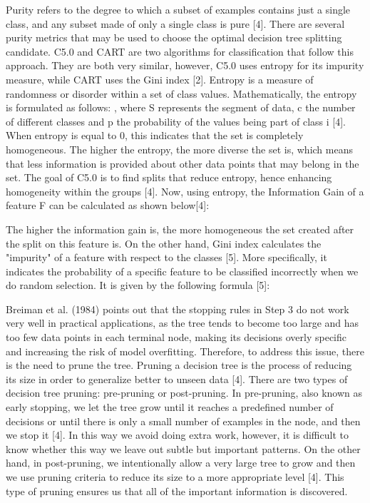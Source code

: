 \documentclass{usiinftr}
\begin{document}
Purity refers to the degree to which a subset of examples contains just a single class, and any subset made of only a single class is pure [4]. There are several purity metrics that may be used to choose the optimal decision tree splitting candidate. C5.0 and CART are two algorithms for classification that follow this approach. They are both very similar, however, C5.0 uses entropy for its impurity measure, while CART uses the Gini index [2]. Entropy is a measure of randomness or disorder within a set of class values. Mathematically, the entropy is formulated as follows: 
,
where S represents the segment of data, c the number of different classes and p the probability of the values being part of class i [4]. When entropy is equal to 0, this indicates that the set is completely homogeneous. The higher the entropy, the more diverse the set is, which means that less information is provided about other data points that may belong in the set. The goal of C5.0 is to find splits that reduce entropy,  hence enhancing homogeneity within the groups [4]. Now, using entropy, the Information Gain of a feature F can be calculated as shown below[4]:

The higher the information gain is, the more homogeneous the set created after the split on this feature is. On the other hand, Gini index calculates the "impurity" of a feature with respect to the classes [5]. More specifically, it indicates the probability of a specific feature to be classified incorrectly when we do random selection. It is given by the following formula [5]:

Breiman et al. (1984) points out that the stopping rules in Step 3 do not work very well in practical applications, as the tree tends to become too large and has too few data points in each terminal node, making its decisions overly specific and increasing the risk of model overfitting. Therefore, to address this issue, there is the need to prune the tree. Pruning a decision tree is the process of reducing its size in order to generalize better to unseen data [4]. There are two types of decision tree pruning: pre-pruning or post-pruning. In pre-pruning, also known as early stopping, we let the tree grow until it reaches a predefined number of decisions or until there is only a small number of examples in the node, and then we stop it [4]. In this way we avoid doing extra work, however, it is difficult to know whether this way we leave out subtle but important patterns. On the other hand, in post-pruning, we intentionally allow a very large tree to grow and then we use pruning criteria to reduce its size to a more appropriate level [4]. This type of pruning ensures us that all of the important information is discovered. 
	
\end{document}
